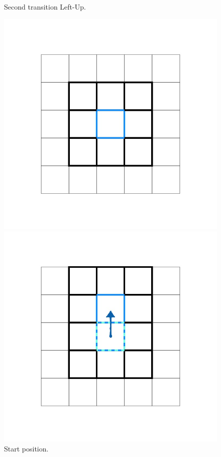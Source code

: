 \documentclass[class=article, crop=false]{standalone}
\begin{document}
\begin{figure}[ht]
\begin{minipage}[c]{0.33\linewidth}
\captionsetup{width=.8\linewidth}
\caption{Second transition Left-Up.}
\label{fig:Thesis_D2Q9andQ9.007}
\end{minipage}


\begin{minipage}[c]{0.33\linewidth}
\centering

\includegraphics[scale=0.17]{draw/Thesis_plots/Thesis_D2Q9andQ9_crop/Thesis_D2Q9andQ9.009}

\captionsetup{width=.8\linewidth}
\caption{Start position.}
\label{fig:Thesis_D2Q9andQ9.009}
\end{minipage}
\begin{minipage}[c]{0.33\linewidth}
\centering

\includegraphics[scale=0.17]{draw/Thesis_plots/Thesis_D2Q9andQ9_crop/Thesis_D2Q9andQ9.010}


\end{minipage}
\end{figure}
\end{document}
